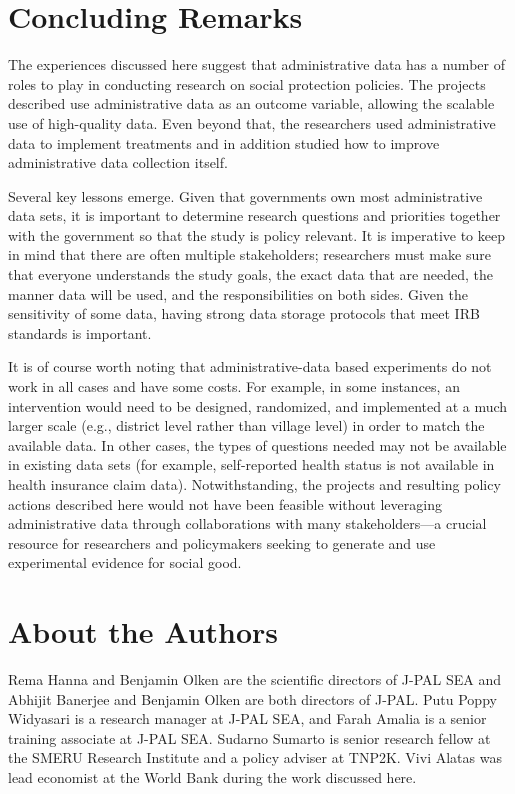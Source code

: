 \documentclass[
]{book}
\begin{document}
\hypertarget{concluding-remarks-5}{%
\section{Concluding Remarks}\label{concluding-remarks-5}}

The experiences discussed here suggest that administrative data has a number of roles to play in conducting research on social protection policies. The projects described use administrative data as an outcome variable, allowing the scalable use of high-quality data. Even beyond that, the researchers used administrative data to implement treatments and in addition studied how to improve administrative data collection itself.

Several key lessons emerge. Given that governments own most administrative data sets, it is important to determine research questions and priorities together with the government so that the study is policy relevant. It is imperative to keep in mind that there are often multiple stakeholders; researchers must make sure that everyone understands the study goals, the exact data that are needed, the manner data will be used, and the responsibilities on both sides. Given the sensitivity of some data, having strong data storage protocols that meet IRB standards is important.

It is of course worth noting that administrative-data based experiments do not work in all cases and have some costs. For example, in some instances, an intervention would need to be designed, randomized, and implemented at a much larger scale (e.g., district level rather than village level) in order to match the available data. In other cases, the types of questions needed may not be available in existing data sets (for example, self-reported health status is not available in health insurance claim data). Notwithstanding, the projects and resulting policy actions described here would not have been feasible without leveraging administrative data through collaborations with many stakeholders---a crucial resource for researchers and policymakers seeking to generate and use experimental evidence for social good.

\hypertarget{about-the-authors-9}{%
\section*{About the Authors}\label{about-the-authors-9}}

Rema Hanna and Benjamin Olken are the scientific directors of J-PAL SEA and Abhijit Banerjee and Benjamin Olken are both directors of J-PAL. Putu Poppy Widyasari is a research manager at J-PAL SEA, and Farah Amalia is a senior training associate at J-PAL SEA. Sudarno Sumarto is senior research fellow at the SMERU Research Institute and a policy adviser at TNP2K. Vivi Alatas was lead economist at the World Bank during the work discussed here.
\end{document}
